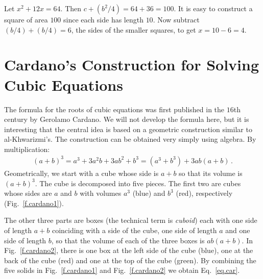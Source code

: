 \begin{example}
Let $x^2+12x=64$. Then $c+(b^2/4)=64+36=100$. It is easy to construct a square of area $100$ since each side has length $10$. Now subtract $(b/4)+(b/4)=6$, the sides of the smaller squares, to get $x=10-6=4$.
\end{example}

\section{Cardano's Construction for Solving Cubic Equations}\label{s.cardano}

The formula for the roots of cubic equations was first published in the $16$th century by Gerolamo Cardano. We will not develop the formula here, but it is interesting that the central idea is based on a geometric construction similar to al-Khwarizmi's. The construction can be obtained very simply using algebra. By multiplication:
\begin{align}\label{eq.car}
(a+b)^3=a^3+3a^2b+3ab^2+b^3=(a^3+b^3)+3ab(a+b)\,.
\end{align}
Geometrically, we start with a cube whose side is $a+b$ so that its volume is $(a+b)^3$. The cube is decomposed into five pieces. The first two are cubes whose sides are $a$ and $b$ with volumes $a^3$ (blue) and $b^3$ (red), respectively (Fig.~\ref{f.cardano1}).

The other three parts are boxes (the technical term is \emph{cuboid}) each with one side of length $a+b$ coinciding with a side of the cube, one side of length $a$ and one side of length $b$, so that the volume of each of the three boxes is $ab(a+b)$. In Fig.~\ref{f.cardano2}, there is one box at the left side of the cube (blue), one at the back of the cube (red) and one at the top of the cube (green).
By combining the five solids in Fig.~\ref{f.cardano1} and Fig.~\ref{f.cardano2} we obtain Eq.~\ref{eq.car}.


